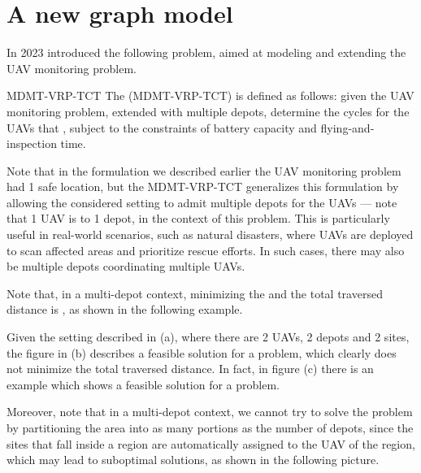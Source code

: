 \documentclass[a4paper, 12pt]{report}
\begin{document}
    \section{A new graph model}

    In 2023 \textcite{calamoneri} introduced the following problem, aimed at modeling and extending the UAV monitoring problem.

    \begin{frameddefn}{MDMT-VRP-TCT}
        The  (MDMT-VRP-TCT) is defined as follows: given the UAV monitoring problem, extended with multiple depots, determine the cycles for the UAVs that , subject to the constraints of battery capacity and flying-and-inspection time.
    \end{frameddefn}
    
    Note that in the formulation we described earlier the UAV monitoring problem had 1 safe location, but the MDMT-VRP-TCT generalizes this formulation by allowing the considered setting to admit multiple depots for the UAVs --- note that 1 UAV is  to 1 depot, in the context of this problem. This is particularly useful in real-world scenarios, such as natural disasters, where UAVs are deployed to scan affected areas and prioritize rescue efforts. In such cases, there may also be multiple depots coordinating multiple UAVs.

    Note that, in a multi-depot context, minimizing the  and the total traversed distance is , as shown in the following example.


    Given the setting described in (a), where there are 2 UAVs, 2 depots and 2 sites, the figure in (b) describes a feasible solution for a  problem, which clearly does not minimize the total traversed distance. In fact, in figure (c) there is an example which shows a feasible solution for a  problem.

    Moreover, note that in a multi-depot context, we cannot try to solve the problem by partitioning the area into as many portions as the number of depots, since the sites that fall inside a region are automatically assigned to the UAV of the region, which may lead to suboptimal solutions, as shown in the following picture.
\end{document}
